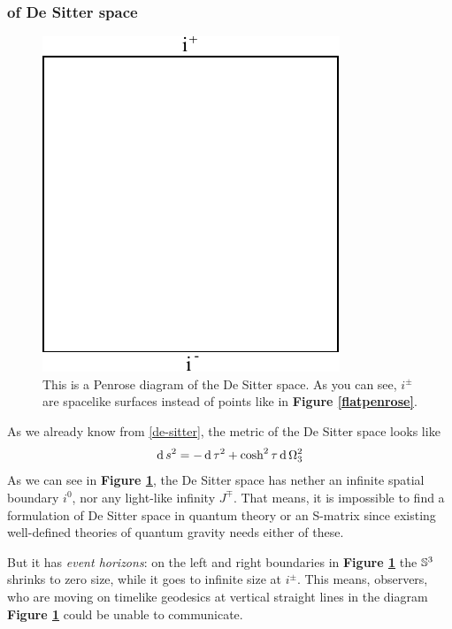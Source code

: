 	\subsubsection{of De Sitter space \checkmark}
	\FloatBarrier
	\begin{figure}[tbp]
	 	\begin{center}
			\includegraphics[scale=0.8]{dspenrose}
		\end{center}
	  		\caption{This is a Penrose diagram of the De Sitter space. As you can see, $i^{\pm}$ are spacelike surfaces instead of points like in \textbf{Figure \ref{flatpenrose}}.}\label{dspenrose}
	\end{figure}
	As we already know from \eqref{de-sitter}, the metric of the De Sitter space looks like
		\begin{equation}
			\operatorname{d} s^2=- \operatorname{d} \tau^2+\cosh^2\tau \operatorname{d} \Omega^2_3
		\end{equation}
	As we can see in \textbf{Figure \ref{dspenrose}}, the De Sitter space has nether an infinite spatial boundary $i^0$, nor any light-like infinity $J^\mp$. That means, it is impossible to find a formulation of De Sitter space in quantum theory or an S-matrix since existing well-defined theories of quantum gravity needs either of these. 
		
	But it has \textit{event horizons}: on the left and right boundaries in \textbf{Figure \ref{dspenrose}} the $\mathbb{S}^3$ shrinks to zero size, while it goes to infinite size at $i^{\pm}$. This means, observers, who are moving on timelike geodesics at vertical straight lines in the diagram \textbf{Figure \ref{dspenrose}} could be unable to communicate.
	 
